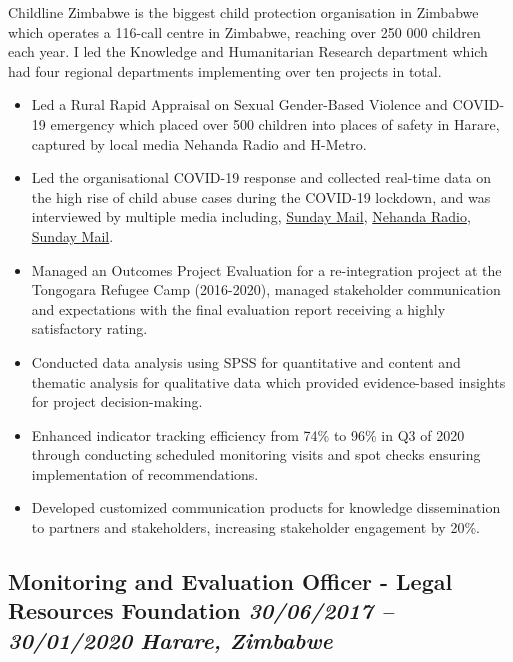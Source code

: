 \documentclass[
  10pt,
]{article}
\providecommand{\tightlist}{%
  \setlength{\itemsep}{0pt}\setlength{\parskip}{0pt}}
\begin{document}
Childline Zimbabwe is the biggest child protection organisation in Zimbabwe which operates a 116-call centre in Zimbabwe, reaching over 250 000 children each year. I led the Knowledge and Humanitarian Research department which had four regional departments implementing over ten projects in total.

\begin{itemize}
\tightlist
\item
Led a Rural Rapid Appraisal on Sexual Gender-Based Violence and COVID-19 emergency which placed over 500 children into places of safety in Harare, captured by local media Nehanda Radio and H-Metro.
\item
Led the organisational COVID-19 response and collected real-time data on the high rise of child abuse cases during the COVID-19 lockdown, and was interviewed by multiple media including, \href{https://www.sundaymail.co.zw/is-your-child-safe-shocking-rise-in-child-abuse-cases}{Sunday Mail}, \href{https://nehandaradio.com/2020/04/17/62-children-removed-from-the-streets/}{Nehanda Radio}, \href{https://www.sundaymail.co.zw/school-misdemeanours-tip-of-the-iceberg}{Sunday Mail}.
\item
Managed an Outcomes Project Evaluation for a re-integration project at the Tongogara Refugee Camp (2016-2020), managed stakeholder communication and expectations with the final evaluation report receiving a highly satisfactory rating.
\item
Conducted data analysis using SPSS for quantitative and content and thematic analysis for qualitative data which provided evidence-based insights for project decision-making.
\item
Enhanced indicator tracking efficiency from 74\% to 96\% in Q3 of 2020 through conducting scheduled monitoring visits and spot checks ensuring implementation of recommendations.
\item
Developed customized communication products for knowledge dissemination to partners and stakeholders, increasing stakeholder engagement by 20\%.
\end{itemize}

\subsection{\texorpdfstring{Monitoring and Evaluation Officer - Legal Resources Foundation \emph{30/06/2017 -- 30/01/2020} \textbar{} \emph{Harare, Zimbabwe}}{Monitoring and Evaluation Officer - Legal Resources Foundation 30/06/2017 -- 30/01/2020 \textbar{} Harare, Zimbabwe}}\label{monitoring-and-evaluation-officer---legal-resources-foundation-30062017-30012020-harare-zimbabwe}
\end{document}
